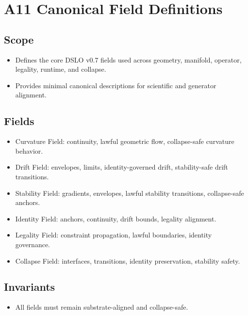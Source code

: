 \section{A11 Canonical Field Definitions}

\subsection{Scope}
\begin{itemize}
    \item Defines the core DSLO v0.7 fields used across geometry, manifold, operator, legality, runtime, and collapse.
    \item Provides minimal canonical descriptions for scientific and generator alignment.
\end{itemize}

\subsection{Fields}
\begin{itemize}
    \item Curvature Field: continuity, lawful geometric flow, collapse-safe curvature behavior.
    \item Drift Field: envelopes, limits, identity-governed drift, stability-safe drift transitions.
    \item Stability Field: gradients, envelopes, lawful stability transitions, collapse-safe anchors.
    \item Identity Field: anchors, continuity, drift bounds, legality alignment.
    \item Legality Field: constraint propagation, lawful boundaries, identity governance.
    \item Collapse Field: interfaces, transitions, identity preservation, stability safety.
\end{itemize}

\subsection{Invariants}
\begin{itemize}
    \item All fields must remain substrate-aligned and collapse-safe.
\end{itemize}
